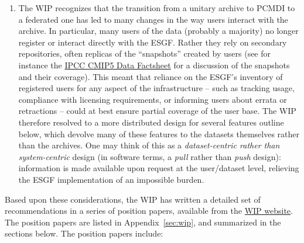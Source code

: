 \documentclass[gmd,manuscript]{copernicus}
\newcommand{\pipref}[1] {\citep{ref:#1}}
\newcommand{\appref}[1] {\mbox{Appendix \ref{sec:#1}}}
\begin{document}
\begin{enumerate}
{    design}. The requirement spans all of the \emph{controlled
    vocabularies} (CVs: for instance the names assigned to models,
  experiments, and output variables) used in the CMIP protocols as
  well as the CMIP6 Data Request \pipref{juckesetal2015}, which must
  be stored in version-controlled, machine-readable formats. Precisely
  documenting the \emph{conformance} of experiments to the protocols
  \pipref{lawrenceetal2012} is an additional requirement.
\item\label{snap} The WIP recognizes that the transition from a
  unitary archive to PCMDI to a federated one has led to many changes
  in the way users interact with the archive. In particular, many
  users of the data (probably a majority) no longer register or
  interact directly with the ESGF. Rather they rely on secondary
  repositories, often replicas of the ``snapshots'' created by users
  (see for instance the \href{https://goo.gl/34AtW6}{IPCC CMIP5 Data
    Factsheet} for a discussion of the snapshots and their coverage).
  This meant that reliance on the ESGF's inventory of registered users
  for any aspect of the infrastructure -- such as tracking usage,
  compliance with licensing requirements, or informing users about
  errata or retractions -- could at best ensure partial coverage of
  the user base. The WIP therefore resolved to a more distributed
  design for several features outline below, which devolve many of
  these features to the datasets themselves rather than the archives.
  One may think of this as a \emph{dataset-centric rather than
    system-centric} design (in software terms, a \emph{pull} rather
  than \emph{push} design): information is made available upon request
  at the user/dataset level, relieving the ESGF implementation of an
  impossible burden.
\end{enumerate}

Based upon these considerations, the WIP has written a detailed set of
recommendations in a series of position papers, available from the
\href{https://www.earthsystemcog.org/projects/wip/}{WIP website}. The
position papers are listed in \appref{wip}, and summarized in the
sections below. The position papers include:
\end{document}
